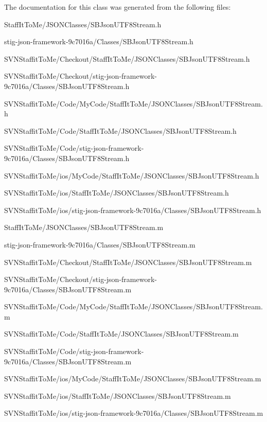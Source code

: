 \-The documentation for this class was generated from the following files\-:\begin{DoxyCompactItemize}
\item 
\-Staff\-It\-To\-Me/\-J\-S\-O\-N\-Classes/\-S\-B\-Json\-U\-T\-F8\-Stream.\-h\item 
stig-\/json-\/framework-\/9c7016a/\-Classes/\-S\-B\-Json\-U\-T\-F8\-Stream.\-h\item 
\-S\-V\-N\-Staffit\-To\-Me/\-Checkout/\-Staff\-It\-To\-Me/\-J\-S\-O\-N\-Classes/\-S\-B\-Json\-U\-T\-F8\-Stream.\-h\item 
\-S\-V\-N\-Staffit\-To\-Me/\-Checkout/stig-\/json-\/framework-\/9c7016a/\-Classes/\-S\-B\-Json\-U\-T\-F8\-Stream.\-h\item 
\-S\-V\-N\-Staffit\-To\-Me/\-Code/\-My\-Code/\-Staff\-It\-To\-Me/\-J\-S\-O\-N\-Classes/\-S\-B\-Json\-U\-T\-F8\-Stream.\-h\item 
\-S\-V\-N\-Staffit\-To\-Me/\-Code/\-Staff\-It\-To\-Me/\-J\-S\-O\-N\-Classes/\-S\-B\-Json\-U\-T\-F8\-Stream.\-h\item 
\-S\-V\-N\-Staffit\-To\-Me/\-Code/stig-\/json-\/framework-\/9c7016a/\-Classes/\-S\-B\-Json\-U\-T\-F8\-Stream.\-h\item 
\-S\-V\-N\-Staffit\-To\-Me/ios/\-My\-Code/\-Staff\-It\-To\-Me/\-J\-S\-O\-N\-Classes/\-S\-B\-Json\-U\-T\-F8\-Stream.\-h\item 
\-S\-V\-N\-Staffit\-To\-Me/ios/\-Staff\-It\-To\-Me/\-J\-S\-O\-N\-Classes/\-S\-B\-Json\-U\-T\-F8\-Stream.\-h\item 
\-S\-V\-N\-Staffit\-To\-Me/ios/stig-\/json-\/framework-\/9c7016a/\-Classes/\-S\-B\-Json\-U\-T\-F8\-Stream.\-h\item 
\-Staff\-It\-To\-Me/\-J\-S\-O\-N\-Classes/\-S\-B\-Json\-U\-T\-F8\-Stream.\-m\item 
stig-\/json-\/framework-\/9c7016a/\-Classes/\-S\-B\-Json\-U\-T\-F8\-Stream.\-m\item 
\-S\-V\-N\-Staffit\-To\-Me/\-Checkout/\-Staff\-It\-To\-Me/\-J\-S\-O\-N\-Classes/\-S\-B\-Json\-U\-T\-F8\-Stream.\-m\item 
\-S\-V\-N\-Staffit\-To\-Me/\-Checkout/stig-\/json-\/framework-\/9c7016a/\-Classes/\-S\-B\-Json\-U\-T\-F8\-Stream.\-m\item 
\-S\-V\-N\-Staffit\-To\-Me/\-Code/\-My\-Code/\-Staff\-It\-To\-Me/\-J\-S\-O\-N\-Classes/\-S\-B\-Json\-U\-T\-F8\-Stream.\-m\item 
\-S\-V\-N\-Staffit\-To\-Me/\-Code/\-Staff\-It\-To\-Me/\-J\-S\-O\-N\-Classes/\-S\-B\-Json\-U\-T\-F8\-Stream.\-m\item 
\-S\-V\-N\-Staffit\-To\-Me/\-Code/stig-\/json-\/framework-\/9c7016a/\-Classes/\-S\-B\-Json\-U\-T\-F8\-Stream.\-m\item 
\-S\-V\-N\-Staffit\-To\-Me/ios/\-My\-Code/\-Staff\-It\-To\-Me/\-J\-S\-O\-N\-Classes/\-S\-B\-Json\-U\-T\-F8\-Stream.\-m\item 
\-S\-V\-N\-Staffit\-To\-Me/ios/\-Staff\-It\-To\-Me/\-J\-S\-O\-N\-Classes/\-S\-B\-Json\-U\-T\-F8\-Stream.\-m\item 
\-S\-V\-N\-Staffit\-To\-Me/ios/stig-\/json-\/framework-\/9c7016a/\-Classes/\-S\-B\-Json\-U\-T\-F8\-Stream.\-m\end{DoxyCompactItemize}
